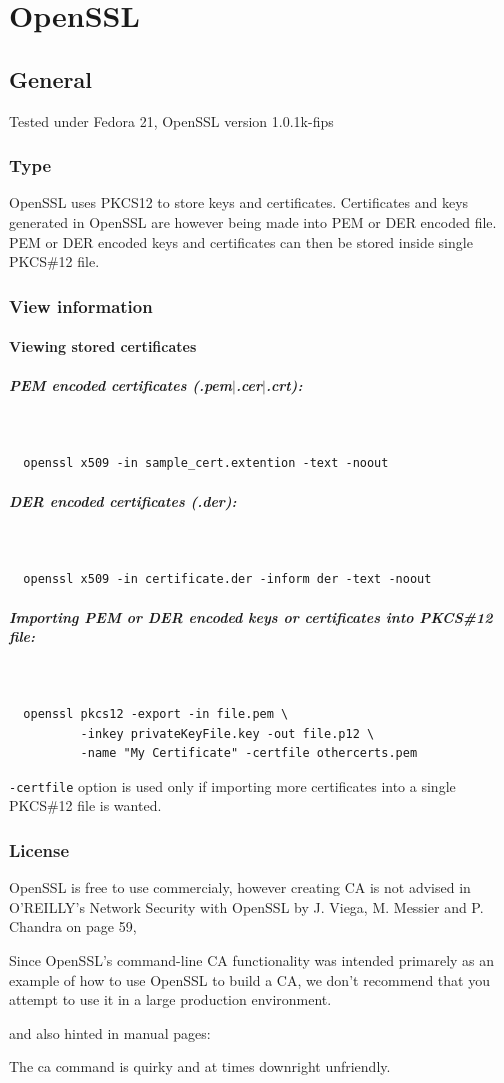 \documentclass[10pt, a4paper]{report}
\newcommand{\myparagraph}[1]{\paragraph{#1}\mbox{}\\} %
\begin{document}
{%
\chapter{OpenSSL}

\section{General}
Tested under Fedora 21, OpenSSL version 1.0.1k-fips
  \subsection{Type}
  OpenSSL uses PKCS12 to store keys and certificates. Certificates and keys generated in OpenSSL are however being made into PEM or DER encoded file. PEM or DER encoded keys and certificates can then be stored inside single PKCS\#12 file. 
             
  \subsection{View information}
  
\subsubsection{Viewing stored certificates}
\myparagraph{PEM encoded certificates (.pem$\vert$.cer$\vert$.crt):}
  \begin{verbatim}
  openssl x509 -in sample_cert.extention -text -noout
  \end{verbatim}
\myparagraph{DER encoded certificates (.der):}
  \begin{verbatim}
  openssl x509 -in certificate.der -inform der -text -noout
  \end{verbatim}
\myparagraph{Importing PEM or DER encoded keys or certificates into PKCS\#12 file:}
  \begin{verbatim}
  openssl pkcs12 -export -in file.pem \
          -inkey privateKeyFile.key -out file.p12 \
          -name "My Certificate" -certfile othercerts.pem
  \end{verbatim}
\verb+-certfile+ option is used only if importing more certificates into a single PKCS\#12 file is wanted.

  
  \subsection{License}
OpenSSL is free to use commercialy, however creating CA is not advised in O'REILLY's Network Security with OpenSSL by J. Viega, M. Messier and P. Chandra on page 59,
\begin{displayquote}
Since OpenSSL's command-line CA functionality was intended primarely as an example of how to use OpenSSL to build a CA, we don't recommend that you attempt to use it in a large production environment.
\end{displayquote}
and also hinted in manual pages:
\begin{displayquote}
The ca command is quirky and at times downright unfriendly.


\end{displayquote}}
\end{document}
